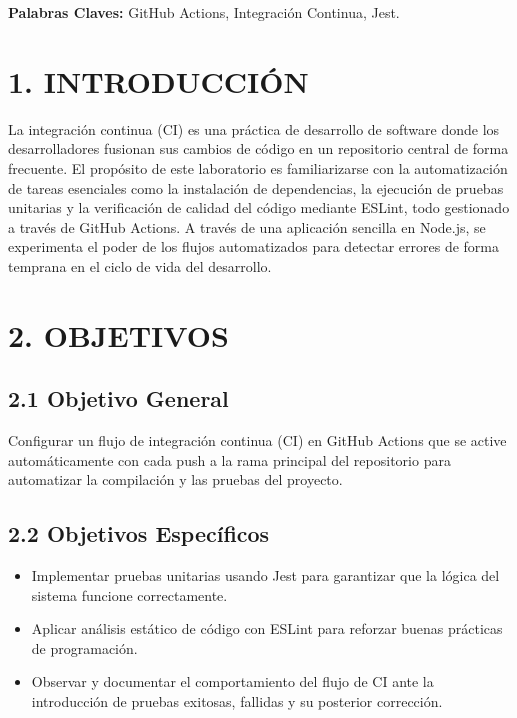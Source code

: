 \documentclass[12pt, a4paper]{article}
\begin{document}
\textbf{Palabras Claves:} GitHub Actions, Integraci\'on Continua, Jest.

\vspace{1cm}

\section*{1. INTRODUCCI\'ON}
La integraci\'on continua (CI) es una pr\'actica de desarrollo de software donde los desarrolladores fusionan sus cambios de c\'odigo en un repositorio central de forma frecuente. El prop\'osito de este laboratorio es familiarizarse con la automatizaci\'on de tareas esenciales como la instalaci\'on de dependencias, la ejecuci\'on de pruebas unitarias y la verificaci\'on de calidad del c\'odigo mediante ESLint, todo gestionado a trav\'es de GitHub Actions. A trav\'es de una aplicaci\'on sencilla en Node.js, se experimenta el poder de los flujos automatizados para detectar errores de forma temprana en el ciclo de vida del desarrollo.

\section*{2. OBJETIVOS}
\subsection*{2.1 Objetivo General}
Configurar un flujo de integraci\'on continua (CI) en GitHub Actions que se active autom\'aticamente con cada push a la rama principal del repositorio para automatizar la compilaci\'on y las pruebas del proyecto.

\subsection*{2.2 Objetivos Espec\'ificos}
\begin{itemize}
    \item Implementar pruebas unitarias usando Jest para garantizar que la l\'ogica del sistema funcione correctamente.
    \item Aplicar an\'alisis est\'atico de c\'odigo con ESLint para reforzar buenas pr\'acticas de programaci\'on.
    \item Observar y documentar el comportamiento del flujo de CI ante la introducci\'on de pruebas exitosas, fallidas y su posterior correcci\'on.
\end{itemize}
\end{document}

